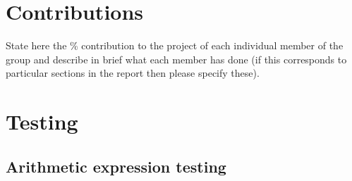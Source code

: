 \documentclass[a4paper, oneside, 11pt]{report}
\begin{document}

\raggedright



\appendix
\chapter{Contributions}

State here the \% contribution to the project of each individual member of the group and describe in brief what each member has done (if this corresponds to particular sections in the report then please specify these).

\chapter{Testing}
\label{app:test}
\section{Arithmetic expression testing}
\end{document}
